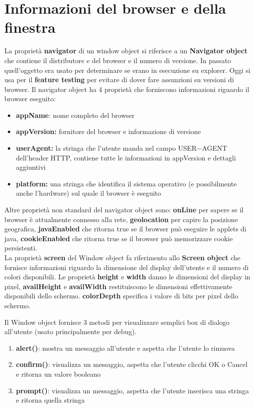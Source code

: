 \section{Informazioni del browser e della finestra}
La proprietà \textbf{navigator} di un window object si riferisce a un \textbf{Navigator object} che contiene il distributore e del browser e il numero di versione. In passato quell'oggetto era usato per determinare se erano in esecuzione su explorer. Oggi si usa per il \textbf{feature testing} per evitare di dover fare assunzioni su versioni di browser.
Il navigator object ha 4 proprietà che forniscono informazioni riguardo il browser eseguito:
\begin{itemize}
    \item \textbf{appName}: nome completo del browser
    \item \textbf{appVersion:} fornitore del browser e informazione di versione
    \item \textbf{userAgent:} la stringa che l'utente manda nel campo USER$-$AGENT dell'header HTTP, contiene tutte le informazioni in appVersion e dettagli aggiuntivi
    \item \textbf{platform:} una stringa che identifica il sistema operativo (e possibilmente anche l'hardware) sul quale il browser è eseguito
\end{itemize}
Altre proprietà non standard del navigator object sono: \textbf{onLine} per sapere se il browser è attualmente connesso alla rete, \textbf{geolocation} per capire la posizione geografica, \textbf{javaEnabled} che ritorna true se il browser può eseguire le applets di java, \textbf{cookieEnabled} che ritorna true se il browser può memorizzare cookie persistenti.\\

La proprietà \textbf{screen} del Window object fa riferimento allo \textbf{Screen object} che fornisce informazioni riguardo la dimensione del display dell'utente e il numero di colori disponibili. Le proprietà \textbf{height} e \textbf{width} danno le dimensioni del display in pixel, \textbf{availHeight} e \textbf{availWidth} restituiscono le dimensioni effettivamente disponibili dello schermo. \textbf{colorDepth} specifica i valore di bits per pixel dello schermo. 

Il Window object fornisce 3 metodi per visualizzare semplici box di dialogo all'utente (usato principalmente per debug). 
\begin{enumerate}
    \item \textbf{alert()}: mostra un messaggio all'utente e aspetta che l'utente lo rimuova
    \item \textbf{confirm()}: visualizza un messaggio, aspetta che l'utente clicchi OK o Cancel e ritorna un valore booleano
    \item \textbf{prompt()}: visualizza un messaggio, aspetta che l'utente inserisca una stringa e ritorna quella stringa
\end{enumerate}

